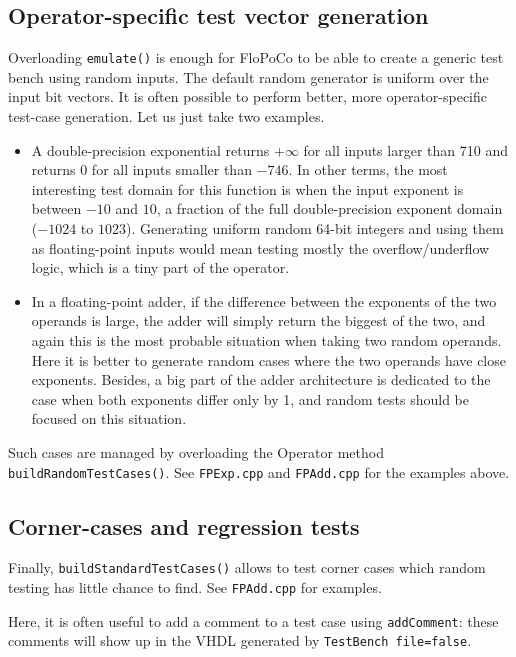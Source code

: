\documentclass{article}
\begin{document}
\subsection{Operator-specific test  vector generation}
Overloading \texttt{\small emulate()} is enough for FloPoCo to be able
to create a generic test bench using random inputs. The default random generator is uniform over the input bit vectors. It is
often possible to perform better, more operator-specific test-case
generation. Let us just take two examples.

\begin{itemize}\item 
  A double-precision exponential returns $+\infty$ for all inputs
  larger than 710 and returns $0$ for all inputs smaller than
  $-746$. In other terms, the most interesting test domain for this
  function is when the input exponent is between $-10$ and $10$, a
  fraction of the full double-precision exponent domain ($-1024$ to
  $1023$). Generating uniform random 64-bit integers and using them as
  floating-point inputs would mean testing mostly the
  overflow/underflow logic, which is a tiny part of the operator.


\item In a floating-point adder, if the difference between the
  exponents of the two operands is large, the adder will simply return
  the biggest of the two, and again this is the most probable
  situation when taking two random operands. Here it is better to
  generate random cases where the two operands have close
  exponents. Besides, a big part of the adder architecture is
  dedicated to the case when both exponents differ only by 1, and
  random tests should be focused on this situation.
\end{itemize}
Such cases are managed by overloading the Operator method  \texttt{\small buildRandomTestCases()}. 
See \texttt{FPExp.cpp} and \texttt{FPAdd.cpp} for the examples above.

\subsection{Corner-cases and regression tests}
Finally, \texttt{\small buildStandardTestCases()} allows to test corner cases which random testing has little chance to find.
See \texttt{\small FPAdd.cpp} for examples. 

Here, it is often useful to add a comment to a test case using \texttt{\small addComment}: these comments
will show up in the VHDL generated by \texttt{\small TestBench file=false}.
\end{document}
